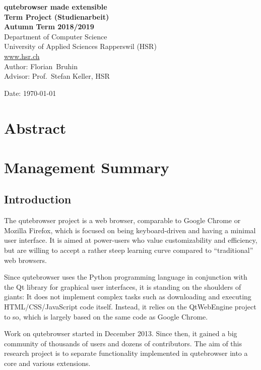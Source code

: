 \documentclass[a4paper,parskip=full,DIV=14,BCOR=15mm]{scrreprt}
\begin{document}
\begin{titlepage}
\begin{flushleft}
{\huge \bfseries qutebrowser made extensible}\\[0.5cm]
{\large \bfseries Term Project (Studienarbeit) \\[0.2cm] Autumn Term 2018/2019}\\[2cm]

Department of Computer Science\\
University of Applied Sciences Rapperswil (HSR)\\
\url{www.hsr.ch}\\[1cm]

Author: Florian~Bruhin\\[0.3cm]
Advisor: Prof.~Stefan Keller, HSR

\vfill
Date: {\today}

\end{flushleft}

\end{titlepage}

\raggedbottom

\chapter*{Abstract}

\chapter*{Management Summary}
\section*{Introduction}
The qutebrowser project is a web browser, comparable to Google Chrome or Mozilla
Firefox, which is focused on being keyboard-driven and having a minimal user
interface. It is aimed at power-users who value customizability and efficiency,
but are willing to accept a rather steep learning curve compared to
``traditional'' web browsers.

Since qutebrowser uses the Python programming language in conjunction with the
Qt library for graphical user interfaces, it is standing on the shoulders of
giants: It does not implement complex tasks such as downloading and executing
HTML/CSS/JavaScript code itself. Instead, it relies on the QtWebEngine project
to so, which is largely based on the same code as Google Chrome.

Work on qutebrowser started in December 2013. Since then, it gained a big
community of thousands of users and dozens of contributors. The aim of this
research project is to separate functionality implemented in qutebrowser into a
core and various extensions.
\end{document}
